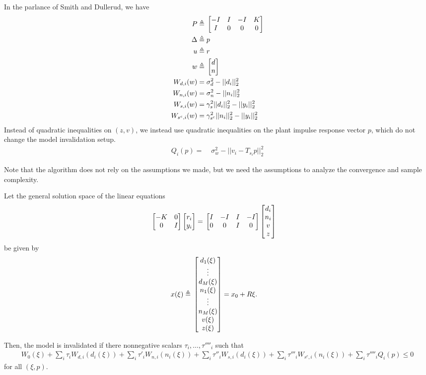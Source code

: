 \documentclass[11pt, onecolumn]{article}
\newcommand{\qq}[1]{{\color{magenta}{(#1)}}}
\newcommand{\rb}[1]{{\color{red}{ #1}}}
\begin{document}
\qq{Ross: make sure it is precise} \rb{I forget which covariance constraint things we came up with}
In the parlance of Smith and Dullerud, we have
\begin{align*}
P \triangleq &\; \begin{bmatrix}-I & I & -I & K\\I & 0 & 0 & 0\end{bmatrix}\\
\Delta \triangleq &\; p \\
u \triangleq &\; r \\
w \triangleq &\; \begin{bmatrix}d\\n\end{bmatrix}\\
W_{d,i}(w) = &\; \sigma_d^2 - ||d_i||_2^2\\
W_{n,i}(w) = &\; \sigma_n^2 - ||n_i||_2^2\\
W_{s,i}(w) = &\; \gamma_s^2||d_i||_2^2 - ||y_i||_2^2\\
W_{s^c,i}(w) = &\; \gamma_{s^c}^2||n_i||_2^2 - ||y_i||_2^2\\
\end{align*}
Instead of quadratic inequalities on $(z,v)$, we instead use quadratic inequalities on the plant impulse response vector $p$, which do not change the model invalidation setup.
\begin{align*}
Q_i(p) = &\; \sigma_w^2 - ||v_i - T_{s_i}p||_2^2 
\end{align*}
\rb{Todo: quadratic equality constraints}

\begin{remark}
  Note that the algorithm does not rely on the assumptions we made, but we need the assumptions to
  analyze the convergence and sample complexity.
\end{remark}

\begin{theorem}
  Let the general solution space of the linear equations
    \begin{align*}
      \begin{bmatrix}-K & 0\\0&I\end{bmatrix}\begin{bmatrix}r_i\\y_i\end{bmatrix} = &\; \begin{bmatrix}I&-I&I&-I\\0&0&I&0\end{bmatrix}\begin{bmatrix}d_i\\n_i\\v\\z\end{bmatrix}
    \end{align*}
  be given by \\
  \begin{align*}
    x(\xi) \triangleq&\; \begin{bmatrix}d_1(\xi)\\\vdots\\d_M(\xi)\\n_1(\xi)\\\vdots\\n_M(\xi)\\v(\xi)\\z(\xi)\end{bmatrix}= x_0 + R\xi.
  \end{align*}

  Then, the model is invalidated if there nonnegative scalars $\tau_i,\ldots,\tau''''_i$ such that
  \begin{align*}
   W_0(\xi) + \sum_i \tau_i W_{d,i}(d_i(\xi)) + \sum_i \tau'_i W_{n,i}(n_i(\xi)) + \sum_i \tau''_i W_{s,i}(d_i(\xi)) + \sum_i \tau'''_i W_{s^c,i}(n_i(\xi)) + \sum_i \tau''''_i Q_i(p) \leq 0
  \end{align*}
  for all $(\xi,p)$.
\end{theorem}
\end{document}
